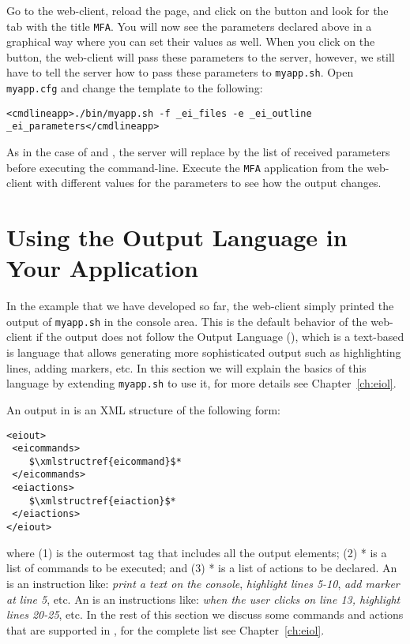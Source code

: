 Go to the web-client, reload the page, and click on the \settingbutton
button and look for the tab with the title \texttt{MFA}.  You will now
see the parameters declared above in a graphical way where you can set
their values as well.  When you click on the \applybutton button, the
web-client will pass these parameters to the server, however, we still
have to tell the server how to pass these parameters to
\texttt{myapp.sh}. Open \texttt{myapp.cfg} and change the
 template to the following:

\medskip
\begin{lstlisting}
<cmdlineapp>./bin/myapp.sh -f _ei_files -e _ei_outline _ei_parameters</cmdlineapp>
\end{lstlisting}

\medskip
\noindent
As in the case of  and , the server
will replace  by the list of received parameters before
executing the command-line. Execute the \texttt{MFA} application from
the web-client with different values for the parameters to see how the
output changes.

\section{Using the \ei Output Language in Your Application}

In the example that we have developed so far, the web-client simply
printed the output of \texttt{myapp.sh} in the console area. This is
the default behavior of the web-client if the output does not follow
the \ei Output Language (\eiol), which is a text-based is language
that allows generating more sophisticated output such as highlighting
lines, adding markers, etc.
%
In this section we will explain the basics of this language by
extending \texttt{myapp.sh} to use it, for more details see
Chapter~\ref{ch:eiol}.

An output in \eiol is an XML structure of the following form:

\medskip
\noindent
\begin{lstlisting}
<eiout> 
 <eicommands>
    $\xmlstructref{eicommand}$*
 </eicommands>
 <eiactions>
    $\xmlstructref{eiaction}$*
 </eiactions>
</eiout>
\end{lstlisting}

\medskip
\noindent
where (1)  is the outermost tag that includes all the
output elements; (2) * is a list of commands
to be executed; and (3) * is a list of actions
to be declared.
%
An  is an instruction like: \emph{print a text
  on the console}, \emph{highlight lines 5-10}, \emph{add marker at
  line 5}, etc.
%
An  is an instructions like: \emph{when the
  user clicks on line 13, highlight lines 20-25}, etc.
%
In the rest of this section we discuss some commands and actions that
are supported in \eiol, for the complete list see
Chapter~\ref{ch:eiol}.

